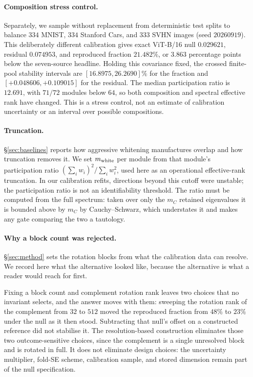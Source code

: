 \paragraph{Composition stress control.}
Separately, we sample without replacement from deterministic test splits to balance $334$ MNIST,
$334$ Stanford Cars, and $333$ SVHN images (seed $20260919$). This deliberately different
calibration gives exact ViT-B/16 null $0.029621$, residual $0.074953$, and reproduced fraction
$21.482\%$, or $3.863$ percentage points below the seven-source headline. Holding this covariance
fixed, the crossed finite-pool stability intervals are $[16.8975,26.2690]\%$ for the fraction and
$[+0.048606,+0.109015]$ for the residual. The median participation ratio is $12.691$, with
$71/72$ modules below $64$, so both composition and spectral effective rank have changed. This is
a stress control, not an estimate of calibration uncertainty or an interval over possible compositions.


\paragraph{Truncation.} \S\ref{sec:baselines} reports how aggressive whitening manufactures
overlap and how truncation removes it.
We set $m_{\rm white}$ per module from that module's participation ratio
$(\sum_i w_i)^2 / \sum_i w_i^2$, used here as an operational effective-rank truncation. In our
calibration refits, directions beyond this cutoff were unstable; the participation ratio is not
an identifiability threshold. The ratio must be computed from the full spectrum:
taken over only the $m_C$ retained eigenvalues it is bounded above by
$m_C$ by Cauchy--Schwarz, which understates it and makes any gate comparing
the two a tautology.

\paragraph{Why a block count was rejected.} \S\ref{sec:method} sets the rotation blocks from
what the calibration data can resolve. We record here what the alternative looked like, because
the alternative is what a reader would reach for first.

Fixing a block count and complement rotation rank leaves two choices that no invariant selects,
and the answer moves with them: sweeping the rotation rank of the complement from $32$
to $512$ moved the reproduced fraction from $48\%$ to $23\%$ under the null as it then stood.
Subtracting that null's offset on a constructed reference did not stabilise it. The
resolution-based construction eliminates those two outcome-sensitive choices, since the
complement is a single unresolved block and is rotated in full. It does not eliminate design
choices: the uncertainty multiplier, fold-SE scheme, calibration sample, and stored dimension
remain part of the null specification.


